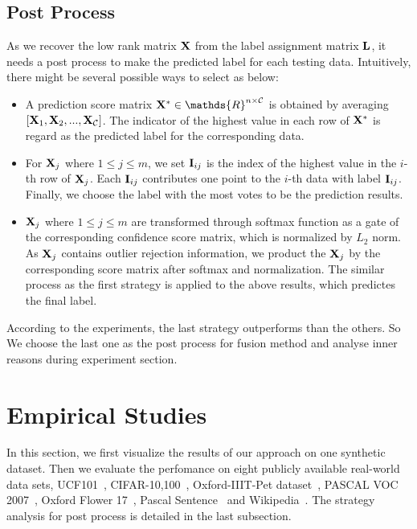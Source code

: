 \documentclass[letterpaper]{article}
\def\bI{{\bf I}}
\def\calC{{\mathcal{C}}}
\def\bL{{\bf L}}
\def\dsR{\mathds{R}}
\def\bX{{\bf X}}
\def\bI{{\bf I}}
\def\bX{{\bf X}}
\begin{document}
\subsection{Post Process}
As we recover the low rank matrix $\bX$ from the label assignment matrix $\bL$,
it needs a post process to make the predicted label for each testing data.
Intuitively, there might be several possible ways to select as below: 
\begin{itemize}
  \item A prediction score matrix $\bX^{*} \in \dsR^{n \times {\calC}}$ is obtained by averaging $[ \bX_1, \bX_2, ..., \bX_{\calC}]$.
		The indicator of the highest value in each row of $\bX^{*}$ is regard as the predicted label for the corresponding data.
  \item For $\bX_j$ where $1 \leq j \leq m$, we set $\bI_{ij}$ is the index of the highest value in the $i$-th row of $\bX_j$.
  		Each $\bI_{ij}$ contributes one point to the $i$-th data with label $\bI_{ij}$.
  		Finally, we choose the label with the most votes to be the prediction results.
  \item $\bX_j$ where $1 \leq j \leq m$ are transformed through softmax function as a gate of the corresponding confidence score matrix, which is normalized by $L_2$ norm.
  		As $\bX_j$ contains outlier rejection information, we product the $\bX_j$ by the corresponding score matrix after softmax and normalization.
  		The similar process as the first strategy is applied to the above results, which predictes the final label.
\end{itemize}
According to the experiments, the last strategy outperforms than the others.
So We choose the last one as the post process for fusion method and analyse inner reasons during experiment section.


\section{Empirical Studies}

In this section, we first visualize the results of our approach on one synthetic dataset. 
Then we evaluate the perfomance on eight publicly available real-world data sets,
UCF101~\cite{soomro2012ucf101}, CIFAR-10,100~\cite{krizhevsky2009learning}, Oxford-IIIT-Pet dataset~\cite{parkhi2012cats}, PASCAL VOC 2007~\cite{pascal-voc-2007}, Oxford Flower 17~\cite{nilsback2006visual}, Pascal Sentence~\cite{rashtchian2010collecting} and Wikipedia~\cite{rasiwasia2010new}.
The strategy analysis for post process is detailed in the last subsection.
\end{document}
